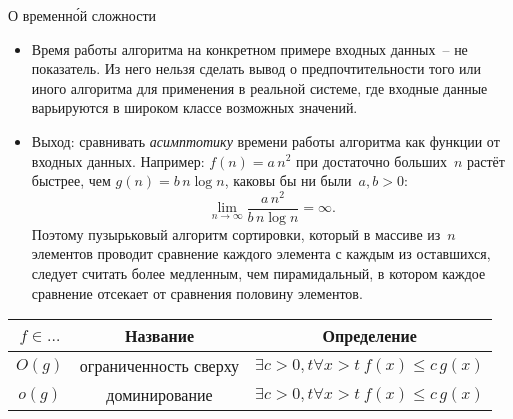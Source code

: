 \documentclass[landscape]{slides}
\begin{document}
\begin{slide}
  О временн\'{о}й сложности
  \begin{itemize}
    \item Время работы алгоритма на конкретном примере входных данных~-- не показатель. Из него нельзя сделать
      вывод о предпочтительности того или иного алгоритма для применения в реальной системе, где входные данные
      варьируются в широком классе возможных значений.
    \item Выход: сравнивать \emph{асимптотику} времени работы алгоритма как функции от входных данных.
      Например: $f(n)=a\,n^2$ при достаточно больших~$n$ растёт быстрее, чем $g(n)=b\,n\log n$, каковы бы ни были~$a,b>0$:
      \[
        \lim_{n \to \infty} \frac{a\,n^2}{b\,n\log n} = \infty .
      \]
      Поэтому пузырьковый алгоритм сортировки, который в массиве из~$n$ элементов проводит сравнение каждого элемента
      с каждым из оставшихся, следует считать более медленным, чем пирамидальный, в котором каждое сравнение отсекает
      от сравнения половину элементов.
  \end{itemize}
\end{slide}

\begin{slide}
  \begin{tabular}{|c|c|c|}
    \hline
    $f\in\ldots$ &
    Название &
    Определение
    \\
    \hline
    $O(g)$&
    ограниченность сверху&
    $\exists c>0, t \forall x>t\ f(x) \leqslant c\,g(x)$
    \\
    \hline
    $o(g)$&
    доминирование&
    $\exists c>0, t \forall x>t\ f(x) \leqslant c\,g(x)$
  \end{tabular}
\end{slide}
\end{document}
